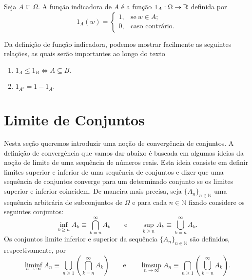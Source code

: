 \begin{definicao}\label{def-funcao-indicadora}
	Seja $A \subseteq \Omega$. 
	A função indicadora  
	de $A$ é a função $1_A: \Omega \to \mathbb{R}$ definida por 
	\[
		1_A(w) =
			\begin{cases}
				1, & \text{se}\ w \in A; \\
				0, & \text{caso contrário.}
			\end{cases}
	\]
\end{definicao}








\begin{observacao} 
	Da definição de função indicadora, podemos mostrar facilmente 
	as seguintes relações,
	as quais serão importantes ao longo do texto
	\begin{enumerate}
		\item 
		$1_A \leqslant 1_B \Leftrightarrow A \subseteq B$.

		\item
		$1_{A^c}= 1- 1_A$.
\end{enumerate}
\end{observacao}







\section{Limite de Conjuntos}

Nesta seção queremos introduzir uma noção de 
convergência de conjuntos. 
A definição de convergência que vamos dar
abaixo é baseada em algumas ideias da noção 
de limite de uma sequência de números reais. 
Esta ideia consiste
em definir limites superior e inferior de uma
sequência de conjuntos e dizer que uma sequência 
de conjuntos converge para um determinado conjunto
se os limites superior e inferior coincidem.
De maneira mais precisa, 
seja $\{A_n\}_{n\in\mathbb{N}}$ uma sequência 
arbitrária de subconjuntos de $\Omega$ 
e para cada $n\in\mathbb{N}$ fixado considere
os seguintes conjuntos: 
\[
\inf \limits_{k\geqslant n} A_k 
	\equiv 
	\displaystyle\bigcap_{k=n}^{\infty}{A_k}
\qquad\text{e}\qquad
\sup \limits_{k\geqslant n} A_k 
	\equiv 
	\displaystyle\bigcup_{k=n}^{\infty}{A_k}.
\]
Os conjuntos limite inferior e superior da sequência 
$\{A_n\}_{n\in\mathbb{N}}$ são definidos, respectivamente,
por
\[
	\liminf \limits_{n \to \infty} A_n 
	\equiv 
	\displaystyle\bigcup_ {n\geqslant 1} 
		\left(\displaystyle\bigcap_{k=n}^{\infty}{A_k} \right)
\qquad\text{e}\qquad
	\limsup \limits_{n \to \infty} A_n 
	\equiv 
	\displaystyle\bigcap_ {n\geqslant 1} 
		\left(\displaystyle\bigcup_{k=n}^{\infty}{A_k} \right).
\]






